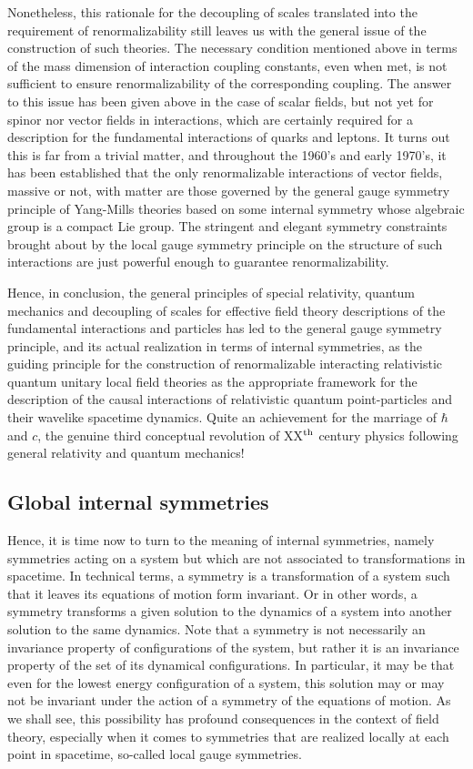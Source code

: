 \documentclass[a4paper,11pt]{article}
\begin{document}
Nonetheless, this rationale for the decoupling of scales translated into
the requirement of renormalizability still leaves us with the general
issue of the construction of such theories. The necessary condition
mentioned above in terms of the mass dimension of interaction coupling
constants, even when met, is not sufficient to ensure renormalizability
of the corresponding coupling. The answer to this issue has been given above
in the case of scalar fields, but not yet for spinor nor vector fields
in interactions, which are certainly required for a description for the
fundamental interactions of quarks and leptons. It turns out this is far
from a trivial matter, and throughout the 1960's and early 1970's, it has 
been established\cite{HV} that the only renormalizable interactions of 
vector fields, 
massive or not, with matter are those governed by the ge\-ne\-ral gauge 
symmetry principle of Yang-Mills theories based on some internal symmetry 
whose algebraic group is a compact Lie group. The stringent and elegant 
symmetry constraints brought about by the local gauge symmetry principle on 
the structure of such interactions are just powerful enough to guarantee 
renormalizability.

Hence, in conclusion, the general principles of special relativity,
quantum mechanics and decoupling of scales for effective field theory
descriptions of the fundamental interactions and particles has led
to the general gauge symmetry principle, and its actual realization
in terms of internal symmetries, as the guiding principle for the
construction of renormalizable interacting relativistic quantum
unitary local field theories as the appropriate framework for the description
of the causal interactions of relativistic quantum point-particles and their
wavelike spacetime dynamics. Quite an achievement for the marriage of
$\hbar$ and $c$, the genuine third conceptual revolution of XX$^{\rm th}$ 
century physics following general relativity and quantum mechanics!

\subsection{Global internal symmetries}
\label{Subsect4.2}

Hence, it is time now to turn to the meaning of internal symmetries, namely
symmetries acting on a system but which are not associated to transformations
in spacetime. In technical terms, a symmetry is a transformation of a
system such that it leaves its equations of motion form invariant. Or in
other words, a symmetry transforms a given solution to the dynamics of
a system into another solution to the same dynamics. Note that a symmetry
is not necessarily an invariance property of configurations of the system,
but rather it is an invariance property of the set of its dynamical
configurations. In particular, it may be that even for the lowest
energy configuration of a system, this solution may or may not be invariant
under the action of a symmetry of the equations of motion. As we shall see,
this possibility has profound consequences in the context of field theory,
especially when it comes to symmetries that are realized locally at each
point in spacetime, so-called local gauge symmetries.
\end{document}

